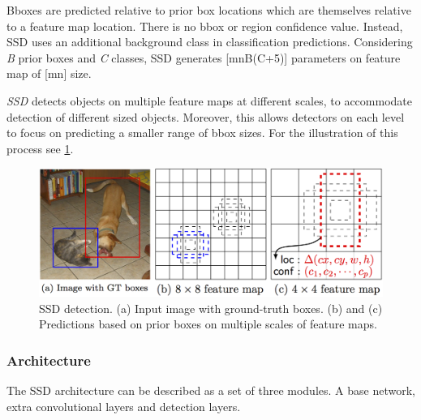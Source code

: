 Bboxes are predicted relative to prior box locations which are themselves relative to a feature map location.  There is no bbox or region confidence value. Instead, SSD uses an additional background class in classification predictions. Considering \textit{B} prior boxes and \textit{C} classes, SSD generates [m\x n\x B\x (C+5)] parameters on feature map of [m\x n] size.

\textit{SSD} detects objects on multiple feature maps at different scales, to accommodate detection of different sized objects. Moreover, this allows detectors on each level to focus on predicting a smaller range of bbox sizes. For the illustration of this process see \cref{fig:ssddet}.

\begin{figure}
    \centering
    \includegraphics[width=\textwidth]{img/ssddet}
    \caption[SSD detection]%
    {SSD detection. (a) Input image with ground-truth boxes. (b) and (c) Predictions based on prior boxes on multiple scales of feature maps.}
    \label{fig:ssddet}
\end{figure}

\subsubsection{Architecture}
The SSD architecture can be described as a set of three modules. A base network, extra convolutional layers and detection layers.

